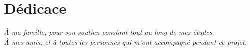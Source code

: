 \chapter*{Dédicace}
\thispagestyle{liminaire}
\vspace*{3cm}
\begin{flushright}
\begin{minipage}{0.75\linewidth}\itshape
À ma famille, pour son soutien constant tout au long de mes études.\\[6pt] À mes amis, et à toutes les personnes qui m'ont accompagné pendant ce projet.
\end{minipage}

\vspace{1cm}
\textbf{\etudiant}
\end{flushright}
